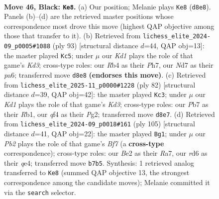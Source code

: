 \documentclass[11pt]{article}
\begin{document}
\clearpage

\begin{figure}[p]\centering
\begin{subfigure}{0.46\textwidth}\centering
\resizebox{\linewidth}{!}{%
\newchessgame
\chessboard[
  setfen={3k4/1p1n4/3R4/8/1r2PQ2/8/4b1PP/K7 b - - 0 46},
  showmover=false,
  pgfstyle=straightmove, color=movearrow, markmove={d8-e8}
]}
\caption{}
\end{subfigure}\hfill
\begin{subfigure}{0.46\textwidth}\centering
\resizebox{\linewidth}{!}{%
\newchessgame
\chessboard[
  setfen={8/r5pp/P2k4/8/4K3/8/3p2PP/R7 b - - 1 47},
  showmover=false,
  pgfstyle=straightmove, color=movearrow, markmove={d6-c5}
]}
\caption{}
\end{subfigure}
\\[4pt]
\begin{subfigure}{0.46\textwidth}\centering
\resizebox{\linewidth}{!}{%
\newchessgame
\chessboard[
  setfen={8/6p1/6k1/1q6/2N5/1p1K4/5PPP/1R6 w - - 8 42},
  showmover=false,
  pgfstyle=straightmove, color=movearrow, markmove={d3-c3}
]}
\caption{}
\end{subfigure}\hfill
\begin{subfigure}{0.46\textwidth}\centering
\resizebox{\linewidth}{!}{%
\newchessgame
\chessboard[
  setfen={8/r3k3/P3n3/8/1P2Q3/2P5/5b2/1K3N2 b - - 0 53},
  showmover=false,
  pgfstyle=straightmove, color=movearrow, markmove={f2-g1}
]}
\caption{}
\end{subfigure}
\caption{\textbf{Move 46, Black: \texttt{Ke8}.} (a) Our position; Melanie plays \texttt{Ke8} (\texttt{d8e8}). Panels (b)--(d) are the retrieved master positions whose correspondence most drove this move (highest QAP objective among those that transfer to it). (b) Retrieved from \texttt{lichess\_elite\_2024-09\_p0005\#1088} (ply 93) [structural distance $d$=44, QAP obj=13]: the master played \texttt{Kc5}; under $\mu$ our \emph{Kd1} plays the role of that game's \emph{Kd3}; cross-type roles: our \emph{R}b4 as their \emph{P}h7, our \emph{N}d7 as their \emph{p}a6; transferred move \texttt{d8e8} \textbf{(endorses this move)}. (c) Retrieved from \texttt{lichess\_elite\_2025-11\_p0000\#1228} (ply 82) [structural distance $d$=39, QAP obj=42]: the master played \texttt{Kc3}; under $\mu$ our \emph{Kd1} plays the role of that game's \emph{Kd3}; cross-type roles: our \emph{P}b7 as their \emph{R}b1, our \emph{q}f4 as their \emph{P}g2; transferred move \texttt{d8e7}. (d) Retrieved from \texttt{lichess\_elite\_2024-09\_p0018\#161} (ply 105) [structural distance $d$=41, QAP obj=22]: the master played \texttt{Bg1}; under $\mu$ our \emph{Pb2} plays the role of that game's \emph{Bf7} (a \textbf{cross-type} correspondence); cross-type roles: our \emph{B}e2 as their \emph{R}a7, our \emph{r}d6 as their \emph{q}e4; transferred move \texttt{b7b5}. Synthesis: 1 retrieved analog transferred to \texttt{Ke8} (summed QAP objective 13, the strongest correspondence among the candidate moves); Melanie committed it via the \texttt{search} selector.}
\label{fig:thought-m91}
\end{figure}
\end{document}
